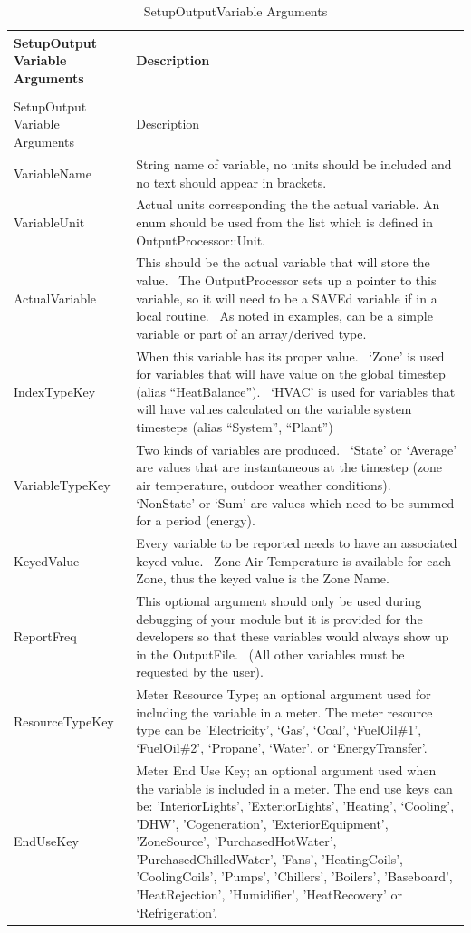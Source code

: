 \begin{longtable}[c]{p{1.5in}p{4.5in}}
\caption{SetupOutputVariable Arguments \label{table:setupoutputvariable-arguments}} \tabularnewline
\toprule
SetupOutput Variable Arguments & Description \tabularnewline
\midrule
\endfirsthead

\caption[]{SetupOutputVariable Arguments} \tabularnewline
\toprule
SetupOutput Variable Arguments & Description \tabularnewline
\midrule
\endhead

VariableName & String name of variable, no units should be included and no text should appear in brackets. \tabularnewline
VariableUnit & Actual units corresponding the the actual variable. An enum should be used from the list which is defined in OutputProcessor::Unit. \tabularnewline
ActualVariable & This should be the actual variable that will store the value.~ The OutputProcessor sets up a pointer to this variable, so it will need to be a SAVEd variable if in a local routine.~ As noted in examples, can be a simple variable or part of an array/derived type. \tabularnewline
IndexTypeKey & When this variable has its proper value.~ ‘Zone’ is used for variables that will have value on the global timestep (alias “HeatBalance”).~ ‘HVAC’ is used for variables that will have values calculated on the variable system timesteps (alias “System”, “Plant”) \tabularnewline
VariableTypeKey & Two kinds of variables are produced.~ ‘State’ or ‘Average’ are values that are instantaneous at the timestep (zone air temperature, outdoor weather conditions).~ ‘NonState’ or ‘Sum’ are values which need to be summed for a period (energy). \tabularnewline
KeyedValue & Every variable to be reported needs to have an associated keyed value. ~Zone Air Temperature is available for each Zone, thus the keyed value is the Zone Name. \tabularnewline
ReportFreq & This optional argument should only be used during debugging of your module but it is provided for the developers so that these variables would always show up in the OutputFile.~ (All other variables must be requested by the user). \tabularnewline
ResourceTypeKey & Meter Resource Type; an optional argument used for including the variable in a meter. The meter resource type can be 'Electricity', ‘Gas’, ‘Coal’, ‘FuelOil\#1’, ‘FuelOil\#2’, ‘Propane’, ‘Water’, or ‘EnergyTransfer’. \tabularnewline
EndUseKey & Meter End Use Key; an optional argument used when the variable is included in a meter. The end use keys can be: 'InteriorLights’, 'ExteriorLights', 'Heating', ‘Cooling’, 'DHW', 'Cogeneration', 'ExteriorEquipment', 'ZoneSource', 'PurchasedHotWater', 'PurchasedChilledWater', 'Fans', 'HeatingCoils', 'CoolingCoils', 'Pumps', 'Chillers', 'Boilers', 'Baseboard', 'HeatRejection', 'Humidifier', 'HeatRecovery' or ‘Refrigeration’. \tabularnewline

\end{longtable}
